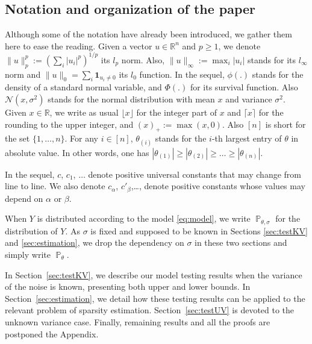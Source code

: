 \documentclass[twoside,11pt]{article}
\def\cN{\mathcal{N}}
\def\1{{\mathbf 1}}
\renewcommand{\P}{\operatorname{\mathbb{P}}}
\newcommand{\<}{\langle}
\renewcommand{\>}{\rangle}
\begin{document}
\subsection{Notation and organization of the paper}

Although some of the notation have already been introduced, we gather them here to ease the reading. 
Given a vector $u\in \mathbb{R}^n$ and $p\geq 1$, we denote $\|u\|_p^p := (\sum_i |u_i|^p)^{1/p}$ its $l_p$ norm. Also, $\|u\|_{\infty} := \max_i |u_i|$  stands for its $l_{\infty}$ norm and $\|u\|_0= \sum_{i}\1_{u_i\neq 0}$ its $l_0$ function. 
In the sequel, $\phi(.)$ stands for the density of a standard normal variable, and $\Phi(.)$ for its survival function. Also $\cN(x,\sigma^2)$ stands for the normal distribution with mean $x$ and variance $\sigma^2$. 
Given $x\in \mathbb{R}$,  we write as usual $\lfloor x\rfloor$ for the integer part of $x$ and $\lceil x\rceil$ for the rounding to the upper integer, and $(x)_+:= \max(x,0)$. Also $[n]$ is short for the set $\{1,\ldots,n\}$. For any $i\in [n]$, $\theta_{(i)}$ stands for the $i$-th largest entry of $\theta$ in absolute value. In other words, one has $|\theta_{(1)}|\geq|\theta_{(2)}|\geq \ldots \geq |\theta_{(n)}|$. 

In the sequel, $c$, $c_1$, $\ldots$ denote positive universal constants that may change from line to line. We also denote $c_{\alpha}$, $c'_{\beta}$,\ldots, denote positive constants whose values may depend on $\alpha$ or $\beta$. 

When $Y$ is distributed according to the model \eqref{eq:model}, we write $\P_{\theta,\sigma}$ for the distribution of $Y$. As $\sigma$ is fixed and supposed to be known in Sections \ref{sec:testKV} and \ref{sec:estimation}, we drop the dependency on $\sigma$ in these two sections and simply write $\P_{\theta}$.


\medskip 

In Section~\ref{sec:testKV}, we describe our model testing results when the variance of the noise is known, presenting both upper and lower bounds. In Section~\ref{sec:estimation}, we detail how these testing results can be applied to the relevant problem of sparsity estimation. Section~\ref{sec:testUV} is devoted to the unknown variance case.  Finally, remaining results and all the proofs are postponed the Appendix.
\end{document}
